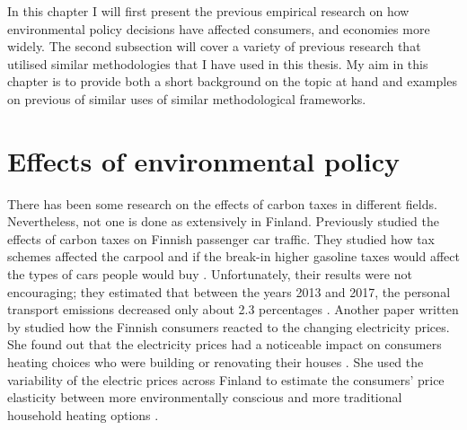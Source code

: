 \documentclass[
  12pt,
  a4paper,
]{report}
\begin{document}
In this chapter I will first present the previous empirical research on how environmental policy decisions have affected consumers, and economies more widely. The second subsection will cover a variety of previous research that utilised similar methodologies that I have used in this thesis. My aim in this chapter is to provide both a short background on the topic at hand and examples on previous of similar uses of similar methodological frameworks.

\hypertarget{effects}{%
\section{Effects of environmental policy}\label{effects}}

There has been some research on the effects of carbon taxes in different fields. Nevertheless, not one is done as extensively in Finland. Previously \citet{palanne2021} studied the effects of carbon taxes on Finnish passenger car traffic. They studied how tax schemes affected the carpool and if the break-in higher gasoline taxes would affect the types of cars people would buy \citep{palanne2021}. Unfortunately, their results were not encouraging; they estimated that between the years 2013 and 2017, the personal transport emissions decreased only about 2.3 percentages \citep{palanne2021}. Another paper written by \citet{sahari2019} studied how the Finnish consumers reacted to the changing electricity prices. She found out that the electricity prices had a noticeable impact on consumers heating choices who were building or renovating their houses \citep{sahari2019}. She used the variability of the electric prices across Finland to estimate the consumers' price elasticity between more environmentally conscious and more traditional household heating options \citep{sahari2019}.
\end{document}
